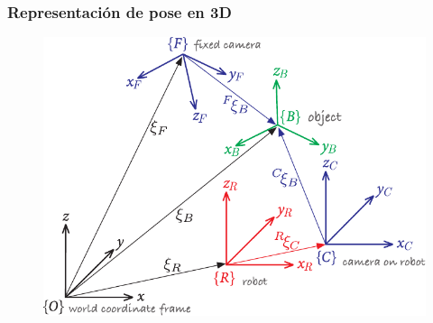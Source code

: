 \begin{frame}
    \frametitle{Representación de pose en 3D}

    \begin{figure}[!h]
        \includegraphics[width=0.6\columnwidth]{./images/multiple_coordinate_frames_3d.pdf}
    \end{figure}

\end{frame}

